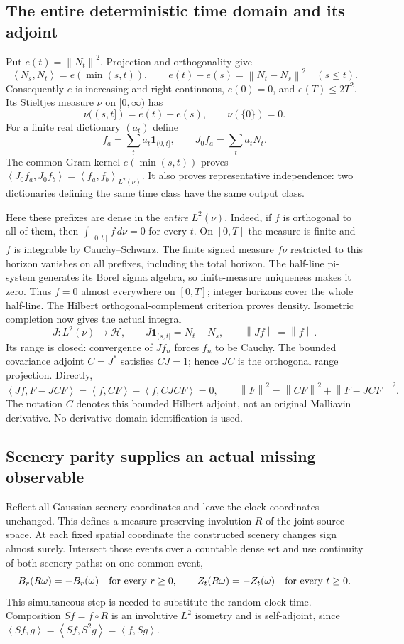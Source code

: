 \documentclass[11pt]{article}
\theoremstyle{remark}\newtheorem{remark}[theorem]{Remark}
\newcommand{\one}{\mathbf1}
\newcommand{\norm}[1]{\left\lVert#1\right\rVert}
\newcommand{\inner}[2]{\left\langle#1,#2\right\rangle}
\newcommand{\HH}{\mathcal H}
\begin{document}
\subsection*{The entire deterministic time domain and its adjoint}
Put $e(t)=\norm{N_t}^2$. Projection and orthogonality give
\[
 \inner{N_s}{N_t}=e(\min(s,t)),\qquad
 e(t)-e(s)=\norm{N_t-N_s}^2\quad(s\leq t).
\]
Consequently $e$ is increasing and right continuous, $e(0)=0$, and
$e(T)\leq2T^2$. Its Stieltjes measure $\nu$ on $[0,\infty)$ has
\[
 \nu((s,t])=e(t)-e(s),\qquad \nu(\{0\})=0.
\]
For a finite real dictionary $(a_t)$ define
\[
 f_a=\sum_t a_t\one_{(0,t]},\qquad
 J_0f_a=\sum_t a_tN_t.
\]
The common Gram kernel $e(\min(s,t))$ proves
$\inner{J_0f_a}{J_0f_b}=\inner{f_a}{f_b}_{L^2(\nu)}$.
It also proves representative independence: two dictionaries defining
the same time class have the same output class.

Here these prefixes are dense in the \emph{entire} $L^2(\nu)$.
Indeed, if $f$ is orthogonal to all of them, then
$\int_{[0,t]}f\,d\nu=0$ for every $t$. On $[0,T]$ the measure
is finite and $f$ is integrable by Cauchy--Schwarz. The finite signed
measure $f\nu$ restricted to this horizon vanishes on all prefixes,
including the total horizon. The half-line pi-system generates its
Borel sigma algebra, so finite-measure uniqueness makes it zero.
Thus $f=0$ almost everywhere on $[0,T]$; integer horizons cover the
whole half-line. The Hilbert orthogonal-complement criterion proves
density. Isometric completion now gives the actual integral
\begin{equation}\label{eq:detisometry}
 J:L^2(\nu)\longrightarrow\HH,\qquad
 J\one_{(s,t]}=N_t-N_s,\qquad \norm{Jf}=\norm f.
\end{equation}
Its range is closed: convergence of $Jf_n$ forces $f_n$ to be Cauchy.
The bounded covariance adjoint $C=J^*$ satisfies $CJ=1$; hence
$JC$ is the orthogonal range projection. Directly,
\[
 \inner{Jf}{F-JCF}=\inner{f}{CF}-\inner{f}{CJC F}=0,
 \qquad
 \norm F^2=\norm{CF}^2+\norm{F-JCF}^2.
\]
The notation $C$ denotes this bounded Hilbert adjoint, not an original
Malliavin derivative. No derivative-domain identification is used.

\subsection*{Scenery parity supplies an actual missing observable}
Reflect all Gaussian scenery coordinates and leave the clock coordinates
unchanged. This defines a measure-preserving involution $R$ of the joint
source space. At each fixed spatial coordinate the constructed scenery
changes sign almost surely. Intersect those events over a countable dense
set and use continuity of both scenery paths: on one common event,
\[
 B_r(R\omega)=-B_r(\omega)\quad\hbox{for every }r\geq0,
 \qquad Z_t(R\omega)=-Z_t(\omega)\quad\hbox{for every }t\geq0.
\]
This simultaneous step is needed to substitute the random clock time.
Composition $Sf=f\circ R$ is an involutive $L^2$ isometry and is
self-adjoint, since
$\inner{Sf}{g}=\inner{Sf}{S^2g}=\inner f{Sg}$.
\end{document}
